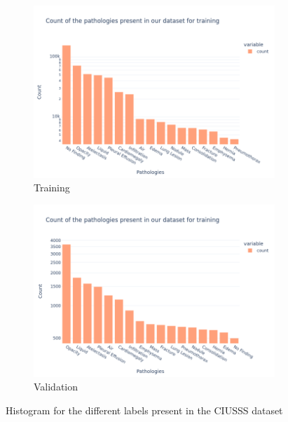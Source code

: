 \documentclass[11pt]{article}
\begin{document}
\begin{figure}
     \centering
     \begin{subfigure}[b]{\textwidth}
         \centering
         \includegraphics[width=\textwidth]{plots/histogram_ciusss_train}
         \caption{Training}

     \end{subfigure}
     \hfill
     \begin{subfigure}[b]{\textwidth}
         \centering
         \includegraphics[width=\textwidth]{plots/histogram_ciusss_valid}
         \caption{Validation}

     \end{subfigure}
     \hfill
     \caption{Histogram for the different labels present in the CIUSSS dataset}

     \label{fig:hist_ciusss}
\end{figure}
\end{document}
